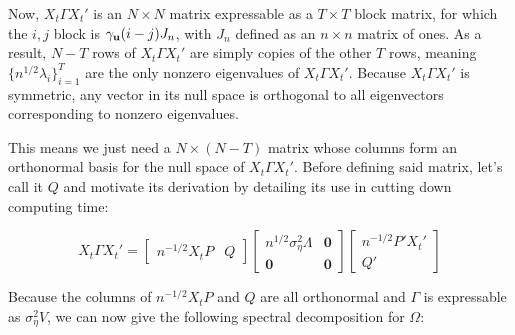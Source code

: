 Now, $X_t\Gamma X_t'$ is an $N \times N$ matrix expressable as a $T \times T$ block matrix, for which the $i,j$ block is $\gamma_{\mathbf{u}}(i-j) J_n$, with $J_n$ defined as an $n \times n$ matrix of ones. As a result, $N-T$ rows of $X_t\Gamma X_t'$ are simply copies of the other $T$ rows, meaning $\{n^{1/2}\lambda_i\}_{i=1}^T$ are the only nonzero eigenvalues of $X_t\Gamma X_t'$. Because $X_t\Gamma X_t'$ is symmetric, any vector in its null space is orthogonal to all eigenvectors corresponding to nonzero eigenvalues. 

This means we just need a $N \times (N-T)$ matrix whose columns form an orthonormal basis for the null space of $X_t\Gamma X_t'$. Before defining said matrix, let's call it $Q$ and motivate its derivation by detailing its use in cutting down computing time:

$$ X_t \Gamma X_t' = \left[\begin{array}{cc}
   n^{-1/2} X_t P & Q  
\end{array}\right] \left[\begin{array}{cc}
    n^{1/2}\sigma_\eta^2\Lambda & \mathbf{0} \\
    \mathbf{0} & \mathbf{0}
\end{array}\right] \left[\begin{array}{cc}
    n^{-1/2}P'X_t'  \\
    Q' 
\end{array}\right] $$

Because the columns of $n^{-1/2}X_tP$ and $Q$ are all orthonormal and $\Gamma$ is expressable as $\sigma_\eta^2 V$, we can now give the following spectral decomposition for $\Omega$:



